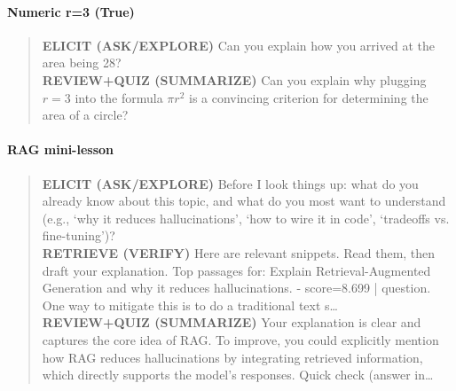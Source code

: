 \paragraph{Numeric r=3 (True)}
\begin{quote}\small
\textbf{ELICIT (ASK/EXPLORE)} Can you explain how you arrived at the area being 28?
\\[0.2em]
\textbf{REVIEW+QUIZ (SUMMARIZE)} Can you explain why plugging \( r = 3 \) into the formula \( \pi r^2 \) is a convincing criterion for determining the area of a circle?
\\[0.2em]
\end{quote}
\paragraph{RAG mini-lesson}
\begin{quote}\small
\textbf{ELICIT (ASK/EXPLORE)} Before I look things up: what do you already know about this topic, and what do you most want to understand (e.g., ‘why it reduces hallucinations’, ‘how to wire it in code’, ‘tradeoffs vs. fine-tuning’)?
\\[0.2em]
\textbf{RETRIEVE (VERIFY)} Here are relevant snippets. Read them, then draft your explanation. Top passages for: Explain Retrieval-Augmented Generation and why it reduces hallucinations. - score=8.699 | question. One way to mitigate this is to do a traditional text s…
\\[0.2em]
\textbf{REVIEW+QUIZ (SUMMARIZE)} Your explanation is clear and captures the core idea of RAG. To improve, you could explicitly mention how RAG reduces hallucinations by integrating retrieved information, which directly supports the model's responses. Quick check (answer in…
\\[0.2em]
\end{quote}